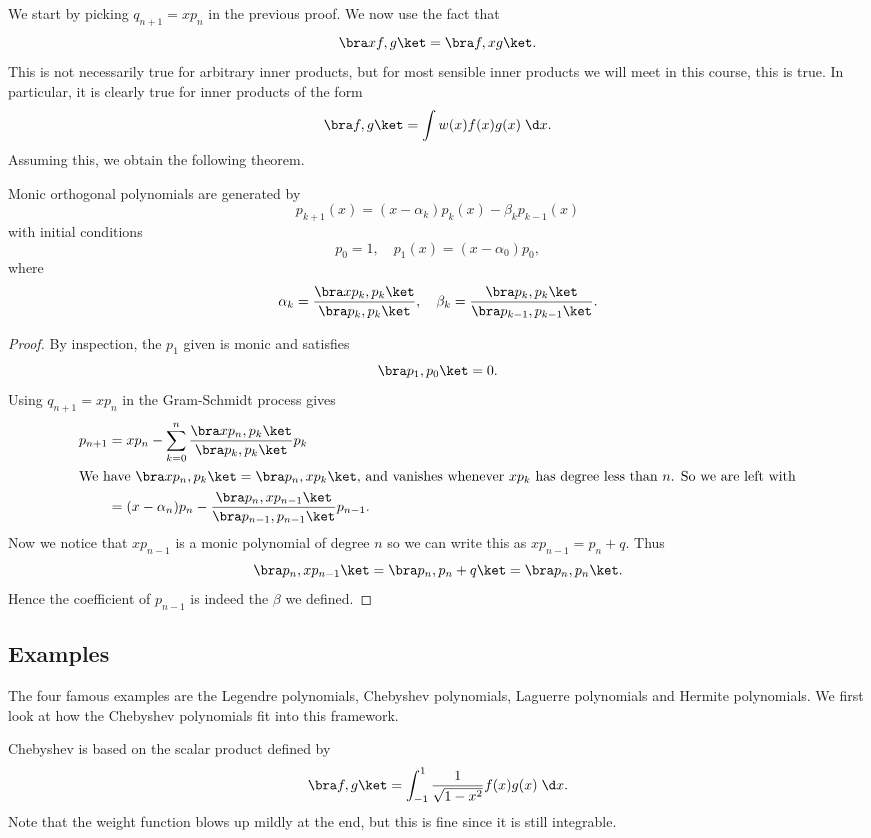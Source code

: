 \documentclass[a4paper]{article}
\begin{document}
We start by picking $q_{n + 1} = xp_n$ in the previous proof. We now use the fact that
\[
  \bra xf, g\ket = \bra f, xg\ket.
\]
This is not necessarily true for arbitrary inner products, but for most sensible inner products we will meet in this course, this is true. In particular, it is clearly true for inner products of the form
\[
  \bra f, g\ket = \int w(x) f(x) g(x)\;\d x.
\]
Assuming this, we obtain the following theorem.
\begin{thm}
  Monic orthogonal polynomials are generated by
  \[
    p_{k + 1}(x) = (x - \alpha_k)p_k(x) - \beta_k p_{k - 1}(x)
  \]
  with initial conditions
  \[
    p_0 = 1,\quad p_1(x) = (x - \alpha_0) p_0,
  \]
  where
  \[
    \alpha_k = \frac{\bra x p_k, p_k\ket}{\bra p_k, p_k\ket},\quad \beta_k = \frac{\bra p_k, p_k\ket}{\bra p_{k - 1}, p_{k - 1}\ket}.
  \]
\end{thm}

\begin{proof}
  By inspection, the $p_1$ given is monic and satisfies
  \[
    \bra p_1, p_0\ket = 0.
  \]
  Using $q_{n + 1} = x p_n$ in the Gram-Schmidt process gives
  \begin{align*}
    p_{n + 1} &= xp_n - \sum_{k = 0}^n \frac{\bra x p_n, p_k\ket}{\bra p_k, p_k\ket} p_k\\
    \intertext{We have $\bra xp_n, p_k\ket = \bra p_n, xp_k\ket$, and vanishes whenever $x p_k$ has degree less than $n$. So we are left with}
    &= (x - \alpha_n) p_n - \frac{\bra p_n, xp_{n - 1}\ket}{\bra p_{n - 1}, p_{n - 1}\ket} p_{n - 1}.
  \end{align*}
  Now we notice that $xp_{n - 1}$ is a monic polynomial of degree $n$ so we can write this as $x p_{n - 1} = p_n + q$. Thus
  \[
    \bra p_n, xp_{n - 1}\ket = \bra p_n, p_n + q\ket = \bra p_n, p_n\ket.
  \]
  Hence the coefficient of $p_{n - 1}$ is indeed the $\beta$ we defined.
\end{proof}

\subsection{Examples}
The four famous examples are the Legendre polynomials, Chebyshev polynomials, Laguerre polynomials and Hermite polynomials. We first look at how the Chebyshev polynomials fit into this framework.

Chebyshev is based on the scalar product defined by
\[
  \bra f, g\ket = \int_{-1}^1 \frac{1}{\sqrt{1 - x^2}} f(x) g(x)\;\d x.
\]
Note that the weight function blows up mildly at the end, but this is fine since it is still integrable.
\end{document}
